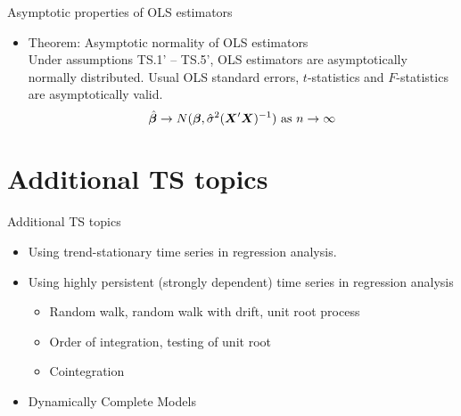 \documentclass{beamer}
\begin{document}

\begin{frame}{Asymptotic properties of OLS estimators}
\begin{itemize}
\item Theorem: Asymptotic normality of OLS estimators \\
\vspace{0.5cm}
Under assumptions TS.1' – TS.5', OLS estimators are asymptotically normally distributed. Usual OLS standard errors, $t$-statistics and $F$-statistics are asymptotically valid.
$$
\hat{\bm{\beta}} \rightarrow N(\bm{\beta}, \hat{\sigma}^2(\bm{X}^{\prime} \bm{X})^{-1} )
\textnormal{~as~} n \rightarrow \infty
$$
\end{itemize}
\end{frame}


\section{Additional TS topics}
\begin{frame}{Additional TS topics}
\begin{itemize}
\item Using trend-stationary time series in regression analysis.

\vspace{0.5cm}

\item Using highly persistent (strongly dependent) time series in regression analysis
\begin{itemize}
\item Random walk, random walk with drift, unit root
process
\item Order of integration, testing of unit root
\item Cointegration
\end{itemize}

\vspace{0.5cm}

\item Dynamically Complete Models
\end{itemize}
\end{frame}

\end{document}
